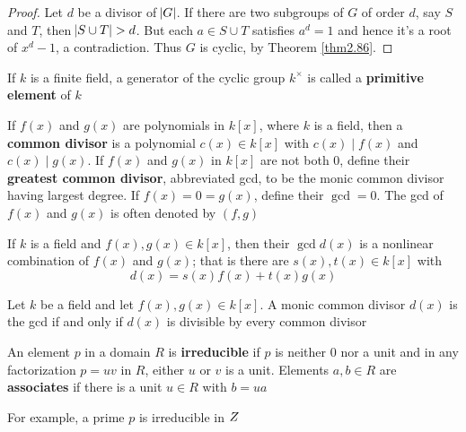 \documentclass[11pt]{article}
\begin{document}
\begin{proof}
Let \(d\) be a divisor of \(\abs{G}\). If there are two subgroups of \(G\) of order
\(d\), say \(S\) and \(T\), then \(\abs{S\cup T}>d\). But each \(a\in S\cup T\)
satisfies \(a^d=1\) and hence it's a root of \(x^d-1\), a contradiction. Thus \(G\)
is cyclic, by Theorem \ref{thm2.86}.
\end{proof}

\begin{definition}[]
If \(k\) is a finite field, a generator of the cyclic group \(k^\times\) is
called a \textbf{primitive element} of \(k\)
\end{definition}

\begin{definition}[]
If \(f(x)\) and \(g(x)\) are polynomials in \(k[x]\), where \(k\) is a field, then a
\textbf{common divisor} is a polynomial \(c(x)\in k[x]\) with \(c(x)\mid f(x)\) and
\(c(x)\mid g(x)\). If \(f(x)\) and \(g(x)\) in \(k[x]\) are not both 0, define their
\textbf{greatest common divisor}, abbreviated gcd, to be the monic common divisor
having largest degree. If \(f(x)=0=g(x)\), define their \(\gcd=0\). The gcd of
\(f(x)\) and \(g(x)\) is often denoted by \((f,g)\)
\end{definition}

\begin{theorem}[]
\label{thm3.31}
If \(k\) is a field and \(f(x),g(x)\in k[x]\), then their \(\gcd d(x)\) is a
nonlinear combination of \(f(x)\) and \(g(x)\); that is there are \(s(x),t(x)\in
   k[x]\) with
\begin{equation*}
d(x)=s(x)f(x)+t(x)g(x)
\end{equation*}
\end{theorem}

\begin{corollary}[]
Let \(k\) be a field and let \(f(x),g(x)\in k[x]\). A monic common divisor
\(d(x)\) is the gcd if and only if \(d(x)\) is divisible by every common divisor
\end{corollary}

\begin{definition}[]
An element \(p\) in a domain \(R\) is \textbf{irreducible} if \(p\) is neither 0 nor a unit
and in any factorization \(p=uv\) in \(R\), either \(u\) or \(v\) is a unit. Elements
\(a,b\in R\) are \textbf{associates} if there is a unit \(u\in R\) with \(b=ua\)
\end{definition}

For example, a prime \(p\) is irreducible in \(\relax{Z}\)
\end{document}
